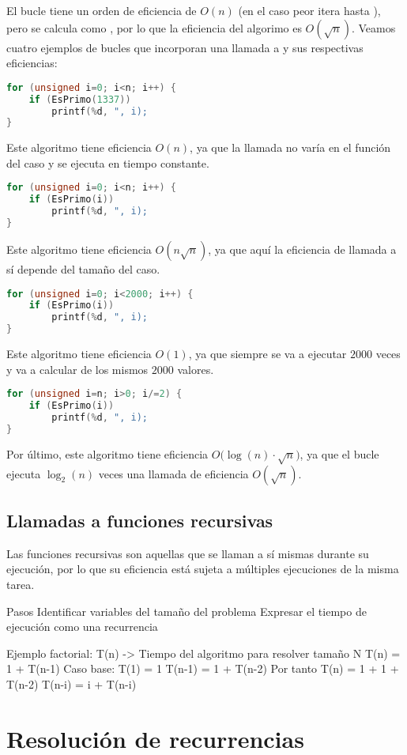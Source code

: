 El bucle  tiene un orden de eficiencia de $O(n)$ (en el caso peor itera hasta ), pero  se calcula como , por lo que la eficiencia del algorimo es $O(\surd n)$.
Veamos cuatro ejemplos de bucles que incorporan una llamada a  y sus respectivas eficiencias:

\begin{lstlisting}[language=C]
for (unsigned i=0; i<n; i++) {
	if (EsPrimo(1337))
		printf(%d, ", i);
}
\end{lstlisting}

Este algoritmo tiene eficiencia $O(n)$, ya que la llamada  no varía en el función del caso y se ejecuta en tiempo constante.

\begin{lstlisting}[language=C]
for (unsigned i=0; i<n; i++) {
	if (EsPrimo(i))
		printf(%d, ", i);
}
\end{lstlisting}

Este algoritmo tiene eficiencia $O(n\surd n)$, ya que aquí la eficiencia de llamada a  sí depende del tamaño del caso.

\begin{lstlisting}[language=C]
for (unsigned i=0; i<2000; i++) {
	if (EsPrimo(i))
		printf(%d, ", i);
}
\end{lstlisting}

Este algoritmo tiene eficiencia $O(1)$, ya que siempre se va a ejecutar $2000$ veces y va a calcular  de los mismos $2000$ valores.

\pagebreak

\begin{lstlisting}[language=C]
for (unsigned i=n; i>0; i/=2) {
	if (EsPrimo(i))
		printf(%d, ", i);
}
\end{lstlisting}

Por último, este algoritmo tiene eficiencia $O\big(\log(n)\cdot\surd n\big)$, ya que el bucle  ejecuta $\log_2(n)$ veces una llamada de eficiencia $O(\surd n)$.

\subsection{Llamadas a funciones recursivas}

Las funciones recursivas son aquellas que se llaman a sí mismas durante su ejecución, por lo que su eficiencia está sujeta a múltiples ejecuciones de la misma tarea.

Pasos
	Identificar variables del tamaño del problema
	Expresar el tiempo de ejecución como una recurrencia

Ejemplo factorial:
	T(n) -> Tiempo del algoritmo para resolver tamaño N
	T(n) = 1 + T(n-1)
	Caso base: T(1) = 1
	T(n-1) = 1 + T(n-2)
		Por tanto T(n) = 1 + 1 + T(n-2)
	T(n-i) = i + T(n-i)



\section{Resolución de recurrencias}

